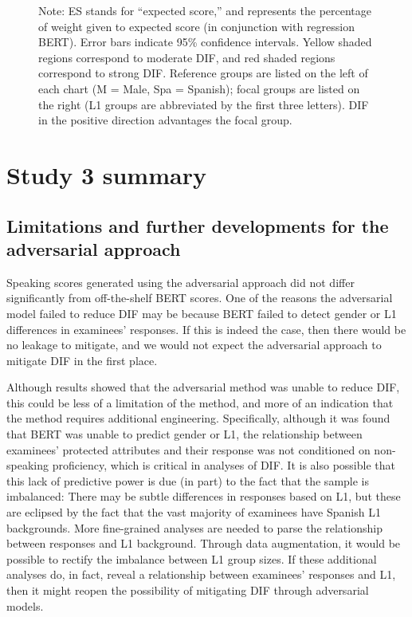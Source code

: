 \documentclass [PhD] {uclathes}
\begin{document}
\begin{figure}[!htb]
\caption*{\small Note: ES stands for “expected score,” and represents the percentage of weight given to expected score (in conjunction with regression BERT). Error bars indicate 95\% confidence intervals. Yellow shaded regions correspond to moderate DIF, and red shaded regions correspond to strong DIF. Reference groups are listed on the left of each chart (M = Male, Spa = Spanish); focal groups are listed on the right (L1 groups are abbreviated by the first three letters). DIF in the positive direction advantages the focal group.}
\end{figure}

\section{Study 3 summary}
\label{sec:stdy3_sum}

\subsection{Limitations and further developments for the adversarial approach}

Speaking scores generated using the adversarial approach did not differ significantly from off-the-shelf BERT scores. One of the reasons the adversarial model failed to reduce DIF may be because BERT failed to detect gender or L1 differences in examinees’ responses. If this is indeed the case, then there would be no leakage to mitigate, and we would not expect the adversarial approach to mitigate DIF in the first place. 

Although results showed that the adversarial method was unable to reduce DIF, this could be less of a limitation of the method, and more of an indication that the method requires additional engineering. Specifically, although it was found that BERT was unable to predict gender or L1, the relationship between examinees’ protected attributes and their response was not conditioned on non-speaking proficiency, which is critical in analyses of DIF. It is also possible that this lack of predictive power is due (in part) to the fact that the sample is imbalanced: There may be subtle differences in responses based on L1, but these are eclipsed by the fact that the vast majority of examinees have Spanish L1 backgrounds. More fine-grained analyses are needed to parse the relationship between responses and L1 background. Through data augmentation, it would be possible to rectify the imbalance between L1 group sizes. If these additional analyses do, in fact, reveal a relationship between examinees’ responses and L1, then it might reopen the possibility of mitigating DIF through adversarial models. 
\end{document}
